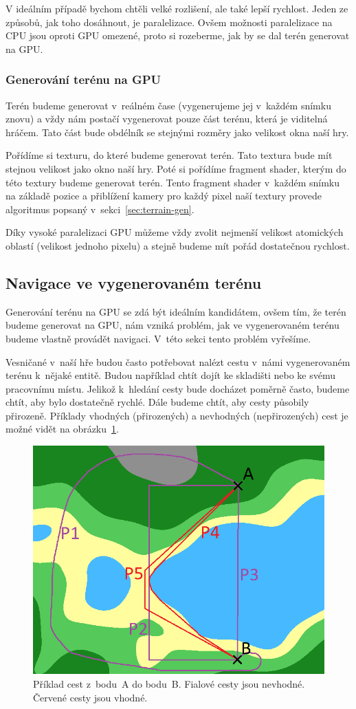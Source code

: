 V ideálním případě bychom chtěli velké rozlišení, ale také lepší rychlost. Jeden ze způsobů, jak toho dosáhnout, je paralelizace. Ovšem možnosti paralelizace na CPU jsou oproti GPU omezené, proto si rozeberme, jak by se dal terén generovat na GPU.

\subsubsection{Generování terénu na GPU}
Terén budeme generovat v~reálném čase (vygenerujeme jej v~každém snímku znovu) a vždy nám postačí vygenerovat pouze část terénu, která je viditelná hráčem. Tato část bude obdélník se stejnými rozměry jako velikost okna naší hry.

Pořídíme si texturu, do které budeme generovat terén. Tato textura bude mít stejnou velikost jako okno naší hry. Poté si pořídíme fragment shader, kterým do této textury budeme generovat terén. Tento fragment shader v~každém snímku na základě pozice a přiblížení kamery pro každý pixel naší textury provede algoritmus popsaný v~sekci~\ref{sec:terrain-gen}.

Díky vysoké paralelizaci GPU můžeme vždy zvolit nejmenší velikost atomických oblastí (velikost jednoho pixelu) a stejně budeme mít pořád dostatečnou rychlost.

\subsection{Navigace ve vygenerovaném terénu}
Generování terénu na GPU se zdá být ideálním kandidátem, ovšem tím, že terén budeme generovat na GPU, nám vzniká problém, jak ve vygenerovaném terénu budeme vlastně provádět navigaci. V~této sekci tento problém vyřešíme.

Vesničané v~naší hře budou často potřebovat nalézt cestu v~námi vygenerovaném terénu k~nějaké entitě. Budou například chtít dojít ke skladišti nebo ke svému pracovnímu místu. Jelikož k~hledání cesty bude docházet poměrně často, budeme chtít, aby bylo dostatečně rychlé. Dále budeme chtít, aby cesty působily přirozeně. Příklady vhodných (přirozených) a nevhodných (nepřirozených) cest je možné vidět na obrázku~\ref{fig:path}.

\begin{figure}[!htb]
    \centering
    \includegraphics[width=0.66\linewidth]{img/path.png}
    \caption{Příklad cest z~bodu~A do bodu~B. Fialové cesty jsou nevhodné. Červené cesty jsou vhodné.}
    \label{fig:path}
\end{figure}

